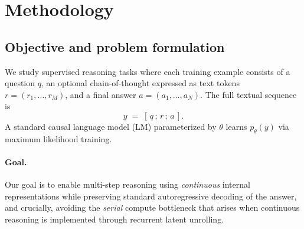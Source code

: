 


\section{Methodology}
\label{sec:method}

\subsection{Objective and problem formulation}
\label{sec:objective}

We study supervised reasoning tasks where each training example consists of a question $q$,
an optional chain-of-thought expressed as text tokens $r = (r_1,\dots,r_M)$, and a final answer
$a = (a_1,\dots,a_N)$. The full textual sequence is
\[
y \;=\; [\,q \,;\, r \,;\, a\,].
\]
A standard causal language model (LM) parameterized by $\theta$ learns $p_\theta(y)$ via maximum
likelihood training.

\paragraph{Goal.}
Our goal is to enable multi-step reasoning using \emph{continuous} internal representations while
preserving standard autoregressive decoding of the answer, and crucially, avoiding the \emph{serial}
compute bottleneck that arises when continuous reasoning is implemented through recurrent latent
unrolling.
\vspace{-3mm}
